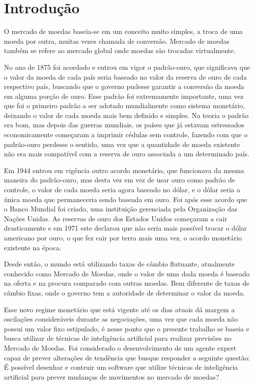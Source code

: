 \chapter[Introdução]{Introdução}

O mercado de moedas baseia-se em um conceito muito simples, a troca de uma moeda
por outra, muitas vezes chamada de conversão.\cite{einzig} Mercado de moedas também se refere
ao mercado global onde moedas são trocadas virtualmente.\cite{anthony}

No ano de 1875 foi acordado e entrou em vigor o padrão-ouro, que significava que o
valor da moeda de cada país seria baseado no valor da reserva de ouro de cada respectivo
país, buscando que o governo pudesse garantir a conversão da moeda em alguma porção
de ouro. Esse padrão foi extremamente importante, uma vez que foi o primeiro padrão
a ser adotado mundialmente como sistema monetário, deixando o valor de cada moeda mais
bem definido e simples. Na teoria o padrão era bom, mas depois das guerras mundiais,
os países que já estavam estressados economicamente começaram a imprimir cédulas sem controle,
fazendo com que o padrão-ouro perdesse o sentido, uma vez que a quantidade de moeda existente
não era mais compatível com a reserva de ouro associada a um determinado país.\cite{investopedia}

Em 1944 entrou em vigência outro acordo monetário, que funcionava da mesma maneira do padrão-ouro,
mas desta vez em vez de usar ouro como padrão de controle, o valor de cada moeda seria agora baseado
no dólar, e o dólar seria a única moeda que permaneceria sendo baseada em ouro. Foi após esse acordo
que o Banco Mundial foi criado, uma instituição gerenciada pela Organização das Nações Unidas. As reservas
de ouro dos Estados Unidos começaram a cair drasticamente e em 1971 este declarou que não seria mais possível
trocar o dólar americano por ouro, o que fez cair por terra mais uma vez, o acordo monetário existente na época.\cite{investopedia}

Desde então, o mundo está utilizando taxas de câmbio flutuante, atualmente conhecido como Mercado de Moedas, onde
o valor de uma dada moeda é baseado na oferta e na procura comparado com outras moedas. Bem diferente de taxas de câmbio fixas,
onde o governo tem a autoridade de determinar o valor da moeda.\cite{maria}

Esse novo regime monetário que está vigente até os dias atuais dá margem a oscilações consideráveis durante as negociações, uma vez
que cada moeda não possui um valor fixo estipulado, é nesse ponto que o presente trabalho se baseia e busca utilizar de técnicas de
inteligência artificial para realizar previsões no Mercado de Moedas. Foi considerado o desenvolvimento de um agente expert capaz de prever
alterações de tendência que busque responder a seguinte questão: É possível desenhar e contruir um software que utilize técnicas de
inteligência artificial para prever mudanças de movimentos no mercado de moedas?



